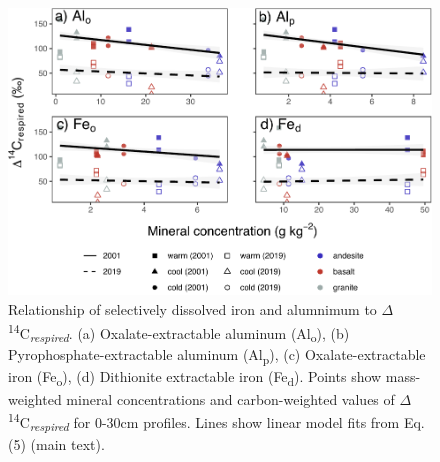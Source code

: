 \documentclass[english,man,floatsintext]{apa6}
\begin{document}
\begin{figure}

{\centering \includegraphics{sra-blk-inc-SI_files/figure-latex/min-all-inc-plot-1} 

}

\caption{Relationship of selectively dissolved iron and alumnimum to \(\Delta\)\textsuperscript{14}C\textsubscript{\emph{respired}}. (a) Oxalate-extractable aluminum (Al\textsubscript{o}), (b) Pyrophosphate-extractable aluminum (Al\textsubscript{p}), (c) Oxalate-extractable iron (Fe\textsubscript{o}), (d) Dithionite extractable iron (Fe\textsubscript{d}). Points show mass-weighted mineral concentrations and carbon-weighted values of \(\Delta\)\textsuperscript{14}C\textsubscript{\emph{respired}} for 0-30cm profiles. Lines show linear model fits from Eq. (5) (main text).}\label{fig:min-all-inc-plot}
\end{figure}
\end{document}
